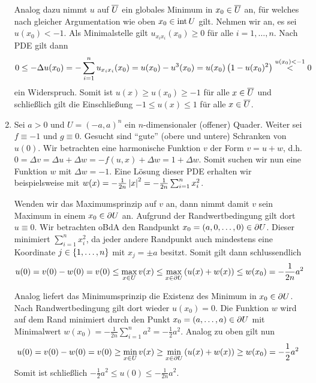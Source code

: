 \begin{exercisePage}
\begin{enumerate}[label=(zu \alph*), leftmargin=*]
		Analog dazu nimmt $u$ auf $\overline{U}$ ein globales Minimum in $x_0 \in \overline{U}$ an, für welches nach gleicher Argumentation wie oben $x_0 \in \operatorname{int} U$ gilt. Nehmen wir an, es sei $u(x_0) < -1$. Als Minimalstelle gilt $u_{x_i  x_i} (x_0) \ge 0$ für alle $i = 1, \dots, n$. Nach PDE gilt dann
		\begin{equation*}
			0 \le - \Delta u(x_0) =  - \sum_{i=1}^n u_{x_i x_i} (x_0) = u(x_0) - u^3(x_0) = u(x_0) \left( 1 - u(x_0)^2 \right) \overset{u(x_0) < -1}{<} 0
		\end{equation*} 
		ein Widerspruch. Somit ist $u(x) \ge u(x_0) \ge -1$ für alle $x \in \overline{U}$ und schließlich gilt die Einschließung $-1 \le u(x) \le 1$ für alle $x \in \overline{U}$.
		
		\item Sei $a > 0$ und $U = (-a , a)^n$ ein $n$-dimensionaler (offener) Quader. Weiter sei $f \equiv -1$ und $g \equiv 0$. Gesucht sind \enquote{gute} (obere und untere) Schranken von $u(0)$.
		Wir betrachten eine harmonische Funktion $v$ der Form $v = u + w$, d.h. $0 = \Delta v = \Delta u + \Delta w = - f(u,x) + \Delta w = 1 + \Delta w$. Somit suchen wir nun eine Funktion $w$ mit $\Delta w = -1$. Eine Lösung dieser PDE erhalten wir beispielsweise mit $w(x) = - \frac{1}{2n} \left| x \right|^2 = - \frac{1}{2n}\sum_{i=1}^n x_i^2$. 
		
		Wenden wir das Maximumsprinzip auf $v$ an, dann nimmt damit $v$ sein Maximum in einem $x_0 \in \partial U$ an. Aufgrund der Randwertbedingung gilt dort $u \equiv 0$. Wir betrachten oBdA den Randpunkt $x_0 = (a, 0, \dots, 0) \in \partial U$. Dieser minimiert $\sum_{i=1}^n x_i^2$, da jeder andere Randpunkt auch mindestens eine Koordinate $j \in \left\{ 1, \dots, n \right\}$ mit $x_j = \pm a$ besitzt. Somit gilt dann schlussendlich
		\begin{equation*}
			u(0) = v(0) - w(0) = v(0) \le \max_{x \in U} v(x) \le \max_{x \in \partial U} \left( u(x) + w(x) \right) \le w(x_0) = - \frac{1}{2n} a^2
		\end{equation*}
		
		Analog liefert das Minimumsprinzip die Existenz des Minimum in $x_0 \in \partial U$. Nach Randwertbedingung gilt dort wieder $u(x_0) = 0$. Die Funktion $w$ wird auf dem Rand minimiert durch den Punkt $x_0 = (a, \dots, a) \in \partial U$ mit Minimalwert $w(x_0) = - \frac{1}{2n} \sum_{i=1}^n a^2 = - \frac{1}{2} a^2$. Analog zu oben gilt nun
		\begin{equation*}
			u(0) = v(0) - w(0) = v(0) \ge \min_{x \in U} v(x) \ge \min_{x \in \partial U} \left( u(x) + w(x) \right) \ge w(x_0) = - \frac{1}{2} a^2
		\end{equation*}
		Somit ist schließlich $- \frac{1}{2} a^2 \le u(0) \le - \frac{1}{2n} a^2$.
		

\end{enumerate}
\end{exercisePage}

